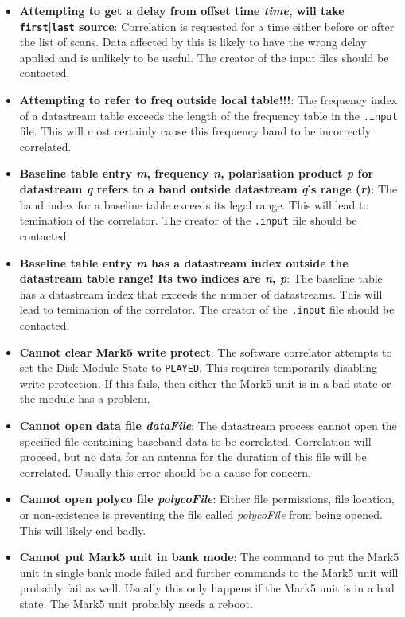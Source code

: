 \begin{itemize}
\item {\bf Attempting to get a delay from offset time {\it time}, will take {\tt first}|{\tt last} source}:
Correlation is requested for a time either before or after the list of scans.
Data affected by this is likely to have the wrong delay applied and is unlikely to be useful.
The creator of the input files should be contacted.

\item {\bf Attempting to refer to freq outside local table!!!}:
The frequency index of a datastream table exceeds the length of the frequency table in the {\tt .input} file.
This will most certainly cause this frequency band to be incorrectly correlated.

\item {\bf Baseline table entry {\it m}, frequency {\it n}, polarisation product {\it p} for datastream {\it q} refers to a band outside datastream {\it q}'s range ({\it r})}:
The band index for a baseline table exceeds its legal range.
This will lead to temination of the correlator.
The creator of the {\tt .input} file should be contacted.

\item {\bf Baseline table entry {\it m} has a datastream index outside the datastream table range! Its two indices are {\it n}, {\it p}}:
The baseline table has a datastream index that exceeds the number of
datastreams.
This will lead to temination of the correlator.
The creator of the {\tt .input} file should be contacted.

\item {\bf Cannot clear Mark5 write protect}:
The software correlator attempts to set the Disk Module State to {\tt PLAYED}.
This requires temporarily disabling write protection.
If this fails, then either the Mark5 unit is in a bad state or the module has a problem.

\item {\bf Cannot open data file {\it dataFile}}:
The datastream process cannot open the specified file containing baseband data to be correlated.
Correlation will proceed, but no data for an antenna for the duration of this file will be correlated.
Usually this error should be a cause for concern.

\item {\bf Cannot open polyco file {\it polycoFile}}:
Either file permissions, file location, or non-existence is preventing the file called {\it polycoFile} from being opened.
This will likely end badly.

\item {\bf Cannot put Mark5 unit in bank mode}:
The command to put the Mark5 unit in single bank mode failed and further commands to the Mark5 unit will probably fail as well.
Usually this only happens if the Mark5 unit is in a bad state.
The Mark5 unit probably needs a reboot.


\end{itemize}
